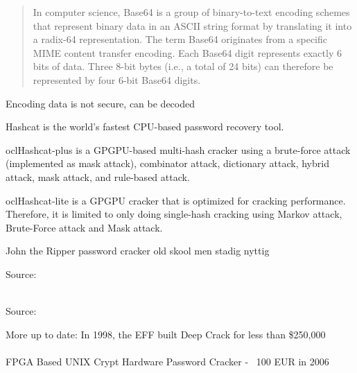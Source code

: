 \documentclass[Screen16to9,17pt]{foils}
\begin{document}

\begin{quote}
In computer science, Base64 is a group of binary-to-text encoding schemes that represent binary data in an ASCII string format by translating it into a radix-64 representation. The term Base64 originates from a specific MIME content transfer encoding. Each Base64 digit represents exactly 6 bits of data. Three 8-bit bytes (i.e., a total of 24 bits) can therefore be represented by four 6-bit Base64 digits.
\end{quote}

\begin{list2}
	\item Encoding data is not secure, can be decoded
	\item {}
\end{list2}



\begin{list2}
\item Hashcat is the world's fastest CPU-based password recovery tool.
\item oclHashcat-plus is a GPGPU-based multi-hash cracker using a brute-force attack (implemented as mask attack), combinator attack, dictionary attack, hybrid attack, mask attack, and rule-based attack.
\item oclHashcat-lite is a GPGPU cracker that is optimized for cracking performance. Therefore, it is limited to only doing single-hash cracking using Markov attack, Brute-Force attack and Mask attack.
\item John the Ripper password cracker old skool men stadig nyttig
\end{list2}

Source:\\
\\




Source: 

{\small
More up to date:  In 1998, the EFF built Deep Crack for less than \$250,000\\
\\
FPGA Based UNIX Crypt Hardware Password Cracker - ~100 EUR in 2006\\
}
\end{document}
